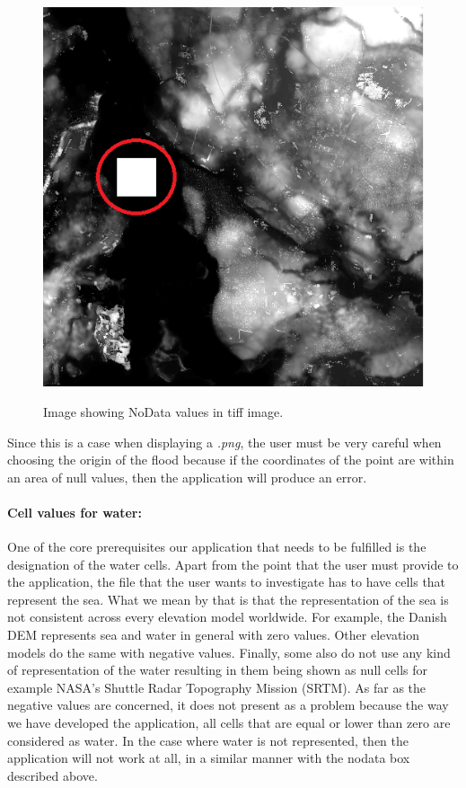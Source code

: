 \begin{figure}[h!]
\centering
{\includegraphics[width=0.8\linewidth]{gfx/Analysis_Specs/nodata.png}}
\caption{Image showing NoData values in tiff image.}
\label{fig:analysis_nodata}
\end{figure}

Since this is a case when displaying a \textit{.png}, the user must be very careful when choosing the origin of the flood because if the coordinates of the point are within an area of null values, then the application will produce an error.

\paragraph{Cell values for water:} One of the core prerequisites our application that needs to be fulfilled is the designation of the water cells. Apart from the point that the user must provide to the application, the file that the user wants to investigate has to have cells that represent the sea. What we mean by that is that the representation of the sea is not consistent across every elevation model worldwide. For example, the Danish DEM represents sea and water in general with zero values. Other elevation models do the same with negative values. Finally, some also do not use any kind of representation of the water resulting in them being shown as null cells for example NASA's Shuttle Radar Topography Mission (SRTM). As far as the negative values are concerned, it does not present as a problem because the way we have developed the application, all cells that are equal or lower than zero are considered as water. In the case where water is not represented, then the application will not work at all, in a similar manner with the nodata box described above.

